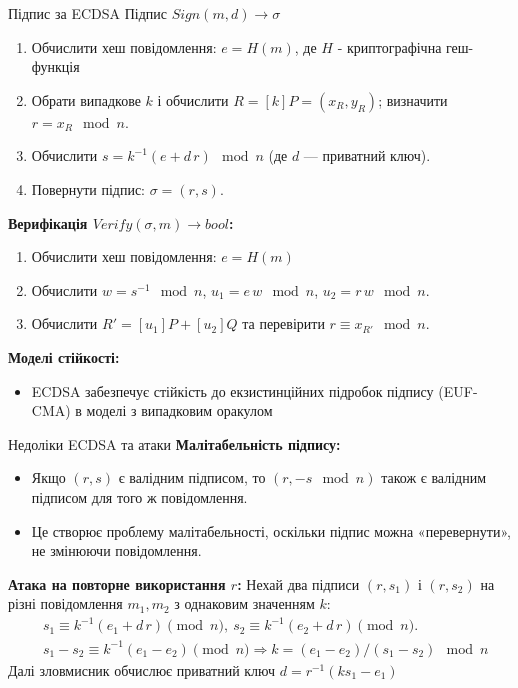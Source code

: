 \documentclass[9pt]{beamer}
\begin{document}
\begin{darkframes}
\begin{frame}{Підпис за ECDSA}
  Підпис $Sign(m, d) \rightarrow \sigma $
  \begin{enumerate}
    \item Обчислити хеш повідомлення: \(e = H(m)\), де $H$ - криптографічна геш-функція
    \item Обрати випадкове \(k\) і обчислити \(R = [k]P = (x_R, y_R) \); визначити \(r = x_R \mod n\).
    \item Обчислити \(s = k^{-1}(e + d\,r) \mod n\) (де \(d\) --- приватний ключ).
    \item Повернути підпис: \(\sigma = (r,s)\).
  \end{enumerate}

  \textbf{Верифікація $Verify(\sigma, m) \rightarrow bool$:}
  \begin{enumerate}
  \item Обчислити хеш повідомлення: \(e = H(m)\)
    \item Обчислити \(w = s^{-1} \mod n\), \(u_1 = e\,w \mod n\), \(u_2 = r\,w \mod n\).
    \item Обчислити \(R' = [u_1]P + [u_2]Q\) та перевірити \(r \equiv x_{R'} \mod n\).
  \end{enumerate}

  \textbf{Моделі стійкості:}
  \begin{itemize}
    \item ECDSA забезпечує стійкість до екзистинційних підробок підпису (EUF-CMA) в моделі з випадковим оракулом
  \end{itemize}
\end{frame}

\begin{frame}{Недоліки ECDSA та атаки}
  \textbf{Малітабельність підпису:}
  \begin{itemize}
    \item Якщо \((r,s)\) є валідним підписом, то \((r, -s \mod n)\) також є валідним підписом для того ж повідомлення.
    \item Це створює проблему малітабельності, оскільки підпис можна «перевернути», не змінюючи повідомлення.
  \end{itemize}
  \textbf{Атака на повторне використання \(r\):}
  Нехай два підписи \((r,s_1)\) і \((r,s_2)\) на різні повідомлення $m_1, m_2$ з однаковим значенням $k$:
  \begin{align*}
  & s_1 \equiv k^{-1}(e_1 + d\,r) \pmod{n},\ s_2 \equiv k^{-1}(e_2 + d\,r) \pmod{n}.\\
  & s_1 - s_2 \equiv k^{-1}(e_1 - e_2) \pmod{n} \Rightarrow k = (e_1-e_2)/(s_1-s_2) \mod{n}
  \end{align*}
Далі зловмисник обчислює приватний ключ $d = r^{-1}(ks_1 -e_1)$


\end{frame}
\end{darkframes}
\end{document}
